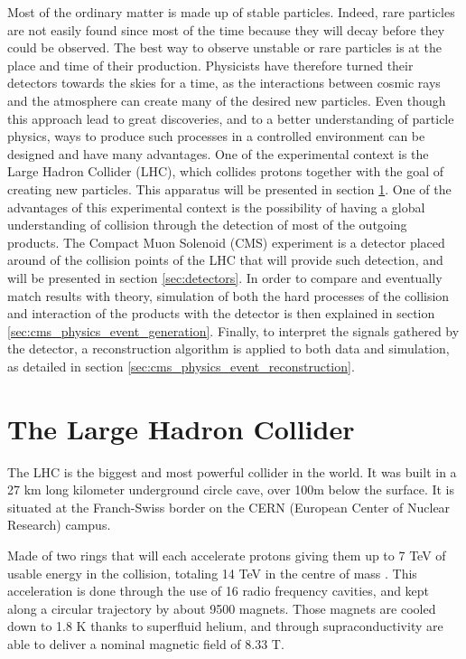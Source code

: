 
Most of the ordinary matter is made up of stable particles. Indeed, rare particles are not easily found since most of the time because they will decay before they could be observed. The best way to observe unstable or rare particles is at the place and time of their production. Physicists have therefore turned their detectors towards the skies for a time, as the interactions between cosmic rays and the atmosphere can create many of the desired new particles. Even though this approach lead to great discoveries, and to a better understanding of particle physics, ways to produce such processes in a controlled environment can be designed and have many advantages. One of the experimental context is the Large Hadron Collider (LHC), which collides protons together with the goal of creating new particles. This apparatus will be presented in section \ref{sec:LHC}. One of the advantages of this experimental context is the possibility of having a global understanding of collision through the detection of most of the outgoing products. The Compact Muon Solenoid (CMS) experiment is a detector placed around of the collision points of the LHC that will provide such detection, and will be presented in section \ref{sec:detectors}. In order to compare and eventually match results with theory, simulation of both the hard processes of the collision and interaction of the products with the detector is then explained in section \ref{sec:cms_physics_event_generation}. Finally, to interpret the signals gathered by the detector, a reconstruction algorithm is applied to both data and simulation, as detailed in section \ref{sec:cms_physics_event_reconstruction}.

\section{The Large Hadron Collider}
\label{sec:LHC}

The LHC is the biggest and most powerful collider in the world. It was built in a 27 km long kilometer underground circle cave, over 100m below the surface. It is situated at the Franch-Swiss border on the CERN (European Center of Nuclear Research) campus.

Made of two rings that will each accelerate protons giving them up to 7 TeV of usable energy in the collision, totaling 14 TeV in the centre of mass \cite{Brüning:782076,Brüning:815187,Benedikt:823808}. This acceleration is done through the use of 16 radio frequency cavities, and kept along a circular trajectory by about 9500 magnets. Those magnets are cooled down to 1.8 K thanks to superfluid helium, and through supraconductivity are able to deliver a nominal magnetic field of 8.33 T.

